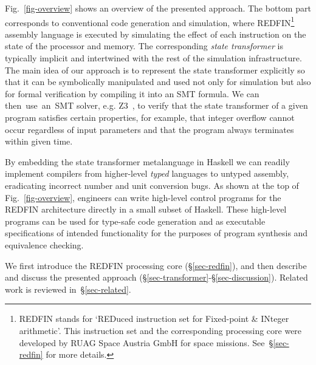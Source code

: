 Fig.~\ref{fig-overview} shows an overview of the presented approach. The bottom
part corresponds to conventional code generation and simulation, where
REDFIN\footnote{REDFIN stands for `REDuced instruction set for Fixed-point \&
INteger arithmetic'. This instruction set and the corresponding processing core
were developed by RUAG Space Austria GmbH for space missions.
See~\S\ref{sec-redfin} for more details.} assembly language is executed by
simulating the effect of each instruction on the state of the processor and memory.
The corresponding \emph{state transformer} is typically implicit and intertwined
with the rest of the simulation infrastructure. The main idea of our approach is
to represent the state transformer explicitly so that it can be symbolically
manipulated and used not only for simulation but also for formal verification by
compiling it into an SMT formula. We can then~use~an~SMT solver, e.g.
Z3~\cite{de2008z3}, to verify that the state transformer of a given program
satisfies certain properties, for example, that integer overflow cannot occur
regardless of input parameters and that the program always terminates within
given time.

By embedding the state transformer metalanguage in Haskell we can readily
implement compilers from higher-level \emph{typed} languages to untyped assembly,
eradicating incorrect number and unit conversion bugs. As shown at the top of
Fig.~\ref{fig-overview}, engineers can write high-level control
programs for the REDFIN architecture directly in a small subset of Haskell. These
high-level programs can be used for type-safe code generation and as executable
specifications of intended functionality for the purposes of program synthesis and
equivalence checking. %

We first introduce the REDFIN processing core (\S\ref{sec-redfin}), and then
describe and discuss the presented approach
(\S\ref{sec-transformer}-\S\ref{sec-discussion}). Related work is reviewed
in~\S\ref{sec-related}.
